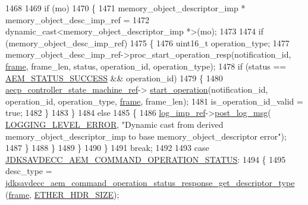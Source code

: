 \begin{DoxyCode}
{{{{1468 
1469             \textcolor{keywordflow}{if} (mo)
1470             \{
1471                 memory\_object\_descriptor\_imp * memory\_object\_desc\_imp\_ref =
1472                     \textcolor{keyword}{dynamic\_cast<}memory\_object\_descriptor\_imp *\textcolor{keyword}{>}(mo);
1473 
1474                 \textcolor{keywordflow}{if} (memory\_object\_desc\_imp\_ref)
1475                 \{
1476                     uint16\_t operation\_type;
1477                     memory\_object\_desc\_imp\_ref->proc\_start\_operation\_resp(notification\_id, 
      \hyperlink{gst__avb__playbin_8c_ac8e710e0b5e994c0545d75d69868c6f0}{frame}, frame\_len, status, operation\_id, operation\_type);
1478                     \textcolor{keywordflow}{if} (status == \hyperlink{namespaceavdecc__lib_affd436edb2cecd20cfd784a84f852b2bac947077909cb590b84f4b5db413080e0}{AEM\_STATUS\_SUCCESS} && operation\_id)
1479                     \{
1480                         \hyperlink{namespaceavdecc__lib_a0b1b5aea3c0490f77cbfd9178af5be22}{aecp\_controller\_state\_machine\_ref}->
      \hyperlink{classavdecc__lib_1_1aecp__controller__state__machine_abedf9eeaef42d341bb70205424c87266}{start\_operation}(notification\_id, operation\_id, operation\_type, 
      \hyperlink{gst__avb__playbin_8c_ac8e710e0b5e994c0545d75d69868c6f0}{frame}, frame\_len);
1481                         is\_operation\_id\_valid = \textcolor{keyword}{true};
1482                     \}
1483                 \}
1484                 \textcolor{keywordflow}{else}
1485                 \{
1486                     \hyperlink{namespaceavdecc__lib_acbe3e2a96ae6524943ca532c87a28529}{log\_imp\_ref}->\hyperlink{classavdecc__lib_1_1log_a68139a6297697e4ccebf36ccfd02e44a}{post\_log\_msg}(
      \hyperlink{namespaceavdecc__lib_a501055c431e6872ef46f252ad13f85cdaf2c4481208273451a6f5c7bb9770ec8a}{LOGGING\_LEVEL\_ERROR}, \textcolor{stringliteral}{"Dynamic cast from derived memory\_object\_descriptor\_imp to base
       memory\_object\_descriptor error"});
1487                 \}
1488             \}
1489         \}
1490     \}
1491     \textcolor{keywordflow}{break};
1492 
1493     \textcolor{keywordflow}{case} \hyperlink{group__command_ga1c534ca8545181b69fbda194a579b022}{JDKSAVDECC\_AEM\_COMMAND\_OPERATION\_STATUS}:
1494     \{
1495         desc\_type = 
      \hyperlink{group__command__operation__status__response_gac62d4d0e0ed3f8d02ab1dabfdd3d50fe}{jdksavdecc\_aem\_command\_operation\_status\_response\_get\_descriptor\_type}
      (\hyperlink{gst__avb__playbin_8c_ac8e710e0b5e994c0545d75d69868c6f0}{frame}, \hyperlink{namespaceavdecc__lib_a6c827b1a0d973e18119c5e3da518e65ca9512ad9b34302ba7048d88197e0a2dc0}{ETHER\_HDR\_SIZE});
}}}}
\end{DoxyCode}
